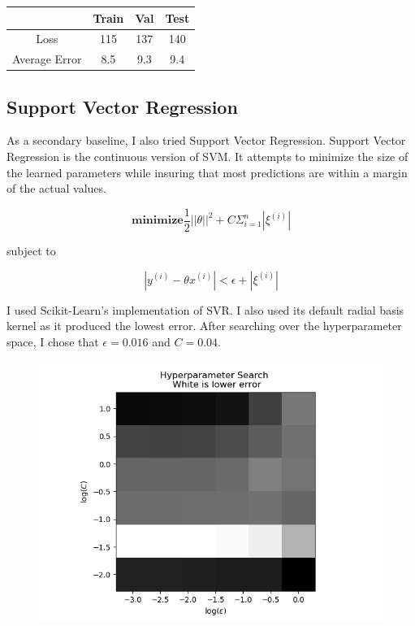 \documentclass[12pt]{article}
\newcommand{\minim}{\ensuremath{\textbf{minimize}}}
\begin{document}
    \begin{center}
    \begin{tabular}{|c|c|c|c|}

        \hline

        & Train & Val & Test \\ \hline
        Loss & 115 & 137 & 140 \\ \hline
        Average Error & 8.5 & 9.3 & 9.4 \\ \hline



    \end{tabular}
    \end{center}

\subsection{Support Vector Regression}

    As a secondary baseline, I also tried Support Vector Regression. Support Vector Regression is the continuous version of SVM. It attempts to minimize the size of the learned parameters while insuring that most predictions are within a margin of the actual values. 

    \begin{equation} \minim \frac{1}{2} ||\theta||^2 + C \Sigma_{i=1}^n |\xi^{(i)}| \end{equation}

        subject to

    \begin{equation} |y^{(i)} - \theta x^{(i)}| < \epsilon + |\xi^{(i)}| \end{equation}

    I used Scikit-Learn's implementation of SVR. I also used its default radial basis kernel as it produced the lowest error. After searching over the hyperparameter space, I chose that $\epsilon = 0.016$ and $C = 0.04$. 


    \begin{figure}[h!]
    \begin{center}
    \includegraphics[scale = 0.5]{"../../output/svr/val_hyperparameter"}
    \end{center}
    \end{figure}
\end{document}
